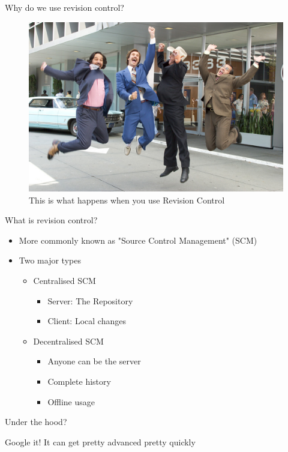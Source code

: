 \documentclass{beamer}
\begin{document}
\begin{frame}{Why do we use revision control?}
\begin{figure}[ht]
\centering
\includegraphics[width=0.8\linewidth]{img/winning.jpg}
\caption{This is what happens when you use Revision Control}
\label{fig:figure1}
\end{figure}
\end{frame}

\begin{frame}{What is revision control?}
\begin{itemize}
    \item More commonly known as "Source Control Management" (SCM)
    \item Two major types
    \begin{itemize}
        \item Centralised SCM
        \begin{itemize}
            \item Server: The Repository
            \item Client: Local changes
        \end{itemize}
        \item Decentralised SCM
        \begin{itemize}
            \item Anyone can be the server %
            \item Complete history
            \item Offline usage
        \end{itemize}
    \end{itemize}  
\end{itemize}  
\end{frame}

\begin{frame}{Under the hood?}
\begin{block}{Google it!}
It can get pretty advanced pretty quickly
\end{block}
\end{frame}
\end{document}
